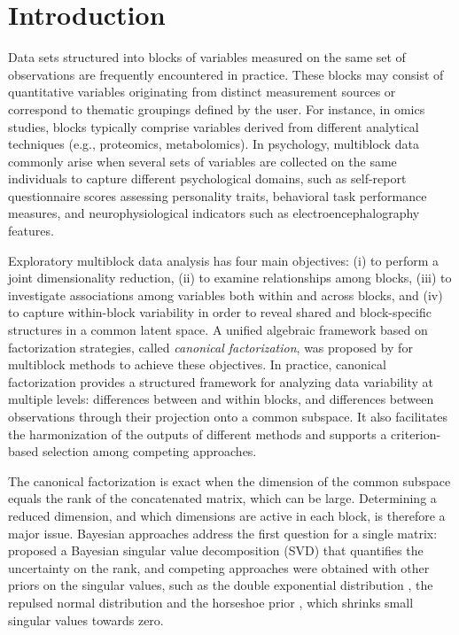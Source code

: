 \documentclass[11pt]{article}
\begin{document}
\section{Introduction}

Data sets structured into blocks of variables measured on the same set of observations are frequently encountered in practice. These blocks may consist of quantitative variables originating from distinct measurement sources or correspond to thematic groupings defined by the user. For instance, in omics studies, blocks typically comprise variables derived from different analytical techniques (e.g., proteomics, metabolomics). In psychology, multiblock data commonly arise when several sets of variables are collected on the same individuals to capture different psychological domains, such as
self-report questionnaire scores assessing personality traits, behavioral task performance measures, and neurophysiological indicators such as electroencephalography features.

Exploratory multiblock data analysis has four main objectives: (i) to perform a joint dimensionality reduction, (ii) to examine relationships among blocks, (iii) to investigate associations among variables both within and across blocks, and (iv) to capture within-block variability in order to reveal shared and block-specific structures in a common latent space.
A unified algebraic framework based on factorization strategies, called \textit{canonical factorization}, was proposed by \cite{bougeard2024} for multiblock methods to achieve these objectives. In practice, canonical factorization provides a structured framework for analyzing data variability at multiple levels: differences between and within blocks, and
differences between observations through their projection onto a common subspace. It also facilitates the harmonization of the outputs of different methods and supports a criterion-based selection among competing approaches.

The canonical factorization is exact when the dimension of the common subspace equals the rank of the concatenated matrix, which can be large. Determining a reduced dimension, and which dimensions are active in each block, is therefore a major issue. Bayesian approaches address the first question for a single matrix: \cite{hoff2007} proposed a Bayesian singular value decomposition (SVD) that quantifies the uncertainty on the rank, and competing approaches were obtained with other priors on the singular values, such as the
double exponential distribution \citep{zhai2023}, the repulsed normal distribution \citep{yuchi2023} and the horseshoe prior \citep{wang2026}, which shrinks small singular values towards zero.
\end{document}
